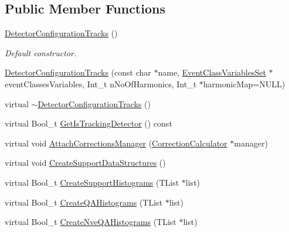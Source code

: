 \subsection*{Public Member Functions}
\begin{DoxyCompactItemize}
\item 
\mbox{\label{classQn_1_1DetectorConfigurationTracks_a5db99a138323b8eb767560a9a5b6534b}} 
\mbox{\hyperlink{classQn_1_1DetectorConfigurationTracks_a5db99a138323b8eb767560a9a5b6534b}{Detector\+Configuration\+Tracks}} ()
\begin{DoxyCompactList}\small\item\em Default constructor. \end{DoxyCompactList}\item 
\mbox{\hyperlink{classQn_1_1DetectorConfigurationTracks_aa98f7415c841d953a1c8b78d874c19d5}{Detector\+Configuration\+Tracks}} (const char $\ast$name, \mbox{\hyperlink{classQn_1_1EventClassVariablesSet}{Event\+Class\+Variables\+Set}} $\ast$event\+Classes\+Variables, Int\+\_\+t n\+No\+Of\+Harmonics, Int\+\_\+t $\ast$harmonic\+Map=N\+U\+LL)
\item 
virtual \mbox{\hyperlink{classQn_1_1DetectorConfigurationTracks_a60ea7cb759b7170b7447ed2e1b506d27}{$\sim$\+Detector\+Configuration\+Tracks}} ()
\item 
virtual Bool\+\_\+t \mbox{\hyperlink{classQn_1_1DetectorConfigurationTracks_ac9b06051e9ec37086f071308e5031b62}{Get\+Is\+Tracking\+Detector}} () const
\item 
virtual void \mbox{\hyperlink{classQn_1_1DetectorConfigurationTracks_a555a9d8add7610402173b755b77bf57d}{Attach\+Corrections\+Manager}} (\mbox{\hyperlink{classQn_1_1CorrectionCalculator}{Correction\+Calculator}} $\ast$manager)
\item 
virtual void \mbox{\hyperlink{classQn_1_1DetectorConfigurationTracks_aef11ff21d7c3fe4b612fe7c886023c7a}{Create\+Support\+Data\+Structures}} ()
\item 
virtual Bool\+\_\+t \mbox{\hyperlink{classQn_1_1DetectorConfigurationTracks_ab32b2790ce27053d640e2682dcc9223d}{Create\+Support\+Histograms}} (T\+List $\ast$list)
\item 
virtual Bool\+\_\+t \mbox{\hyperlink{classQn_1_1DetectorConfigurationTracks_a4ccffb90904f7769abc11c09f5217337}{Create\+Q\+A\+Histograms}} (T\+List $\ast$list)
\item 
virtual Bool\+\_\+t \mbox{\hyperlink{classQn_1_1DetectorConfigurationTracks_a34818d88b49d67ae71561ffd71c02ec1}{Create\+Nve\+Q\+A\+Histograms}} (T\+List $\ast$list)

\end{DoxyCompactItemize}
